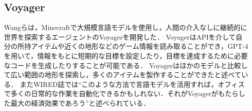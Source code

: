 \subsection{Voyager}
Wangらは，Minecraftで大規模言語モデルを使用し，人間の介入なしに継続的に世界を探索するエージェントのVoyagerを開発した\cite{bib:voyager}．
VoyagerはAPIを介して自分の所持アイテムや近くの地形などのゲーム情報を読み取ることができ，GPT-4を用いて，情報をもとに短期的な目標を設定したり，目標を達成するために必要なコードを生成したりすることが可能である．
Voyagerはほかのモデルと比較して広い範囲の地形を探索し，多くのアイテムを製作することができたと述べている．
またWIRED誌では``このような方法で言語モデルを活用すれば，オフィスで多くの日常的な作業を自動化できるかもしれない．それがVoyagerがもたらした最大の経済効果であろう''と述べられている．
